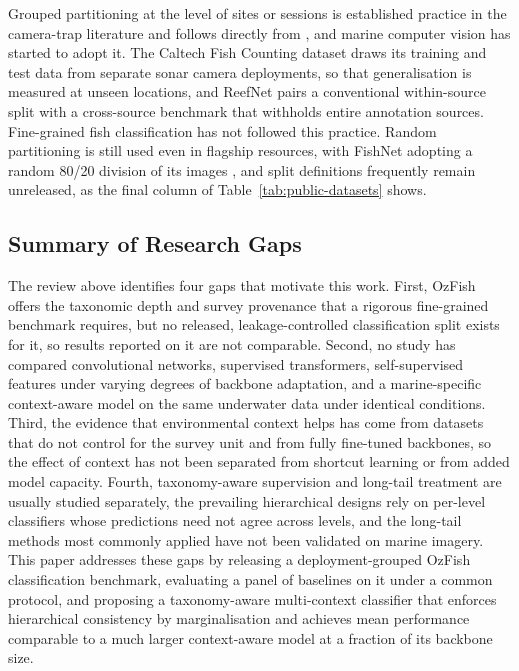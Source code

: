 \documentclass[preprint,12pt]{elsarticle}
\begin{document}
Grouped partitioning at the level of sites or sessions is established
practice in the camera-trap literature
\citep{ref18} and follows directly from \citet{ref17}, and marine computer vision
has started to adopt it. The Caltech Fish Counting dataset
\citep{ref21} draws its training and test data
from separate sonar camera deployments, so that generalisation is
measured at unseen locations, and ReefNet
\citep{ref13} pairs a conventional within-source
split with a cross-source benchmark that withholds entire annotation
sources. Fine-grained fish classification has not followed this
practice. Random partitioning is still used even in flagship resources,
with FishNet adopting a random 80/20 division of its images
\citep{ref10}, and split definitions frequently
remain unreleased, as the final column of Table~\ref{tab:public-datasets} shows.

\subsection{Summary of Research
Gaps}\label{summary-of-research-gaps}

The review above identifies four gaps that motivate this work. First,
OzFish offers the taxonomic depth and survey provenance that a rigorous
fine-grained benchmark requires, but no released, leakage-controlled
classification split exists for it, so results reported on it are not
comparable. Second, no study has compared convolutional networks,
supervised transformers, self-supervised features under varying degrees
of backbone adaptation, and a marine-specific context-aware model on the
same underwater data under identical conditions. Third, the evidence
that environmental context helps has come from datasets that do not
control for the survey unit and from fully fine-tuned backbones, so the
effect of context has not been separated from shortcut learning or from
added model capacity. Fourth, taxonomy-aware supervision and long-tail
treatment are usually studied separately, the prevailing hierarchical
designs rely on per-level classifiers whose predictions need not agree
across levels, and the long-tail methods most commonly applied have not
been validated on marine imagery. This paper addresses these gaps by
releasing a deployment-grouped OzFish classification benchmark,
evaluating a panel of baselines on it under a common protocol, and
proposing a taxonomy-aware multi-context classifier that enforces
hierarchical consistency by marginalisation and achieves mean
performance comparable to a much larger context-aware model at a
fraction of its backbone size.
\end{document}
